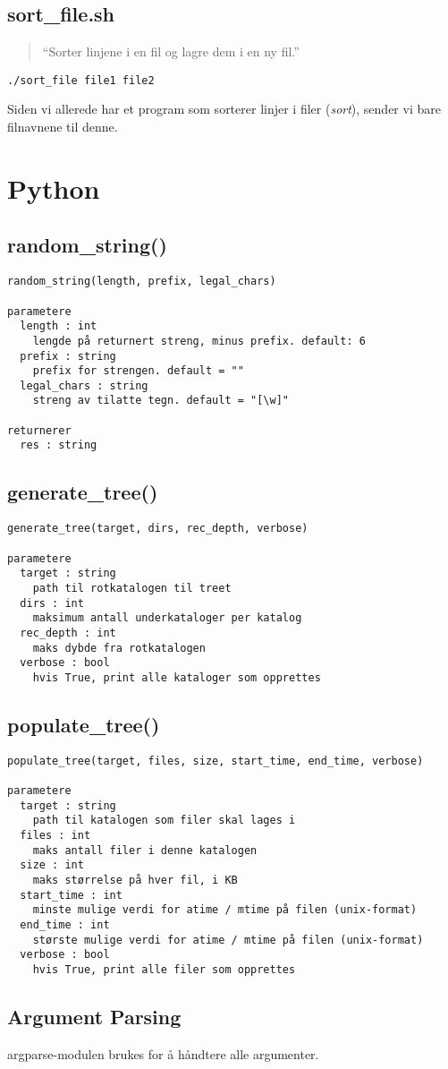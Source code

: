 \documentclass{article}
\begin{document}
\subsection{sort\_file.sh}
\label{sec:py}
\begin{quote}
``Sorter linjene i en fil og lagre dem i en ny fil.''
\end{quote}
\begin{Verbatim}
./sort_file file1 file2
\end{Verbatim}
Siden vi allerede har et program som sorterer linjer i filer (\emph{sort}), sender vi 
bare filnavnene til denne.
\section{Python}

\subsection{random\_string()}
\begin{Verbatim}
random_string(length, prefix, legal_chars)

parametere 
  length : int
    lengde på returnert streng, minus prefix. default: 6
  prefix : string
    prefix for strengen. default = ""
  legal_chars : string
    streng av tilatte tegn. default = "[\w]"

returnerer
  res : string
\end{Verbatim}

\subsection{generate\_tree()}
\begin{Verbatim}
generate_tree(target, dirs, rec_depth, verbose)

parametere 
  target : string
    path til rotkatalogen til treet
  dirs : int
    maksimum antall underkataloger per katalog
  rec_depth : int
    maks dybde fra rotkatalogen
  verbose : bool
    hvis True, print alle kataloger som opprettes
\end{Verbatim}


\subsection{populate\_tree()}
\begin{Verbatim}
populate_tree(target, files, size, start_time, end_time, verbose)

parametere 
  target : string
    path til katalogen som filer skal lages i
  files : int
    maks antall filer i denne katalogen
  size : int
    maks størrelse på hver fil, i KB
  start_time : int
    minste mulige verdi for atime / mtime på filen (unix-format)
  end_time : int
    største mulige verdi for atime / mtime på filen (unix-format)
  verbose : bool
    hvis True, print alle filer som opprettes
\end{Verbatim}

\subsection{Argument Parsing}
argparse-modulen brukes for å håndtere alle argumenter.  
\end{document}
